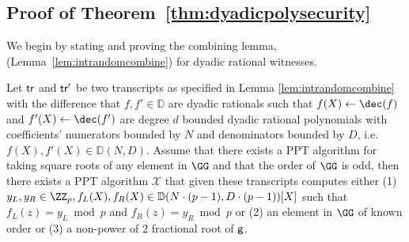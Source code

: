 \subsection{Proof of Theorem~\ref{thm:dyadicpolysecurity}}
\label{apx:dyadic}
We begin by stating and proving the combining lemma, (Lemma~\ref{lem:intrandomcombine}) for dyadic rational witnesses.
\begin{lemma}
\label{lem:dyadiccombining}
Let $\textsf{{tr}}$ and $\textsf{{tr}}'$ be two transcripts as specified in Lemma \ref{lem:intrandomcombine} with the difference that $f,f'\in \mathbb{D}$ are dyadic rationals such that $f(X)\gets \dec(f)$ and $f'(X)\gets \dec(f')$ are degree $d$ bounded dyadic rational polynomials with coefficients' numerators bounded by $N$ and denominators bounded by $D$, i.e. $f(X),f'(X)\in\mathbb{D}(N,D)$.
Assume that there exists a PPT algorithm for taking square roots of any element in $\GG$ and that the order of $\GG$ is odd, then there exists a PPT algorithm $\mathcal{X}$ that given these transcripts computes either (1) $y_L,y_R\in \ZZ_p,f_L(X),f_R(X)\in \mathbb{D}(N\cdot (p-1),D\cdot (p-1))[X]$  such that $f_L(z)=y_L\bmod p$ and $f_R(z)=y_R \bmod p$ or (2) an element in $\GG$ of known order or (3) a non-power of $2$ fractional root of $\mathsf{g}$.
\end{lemma}
